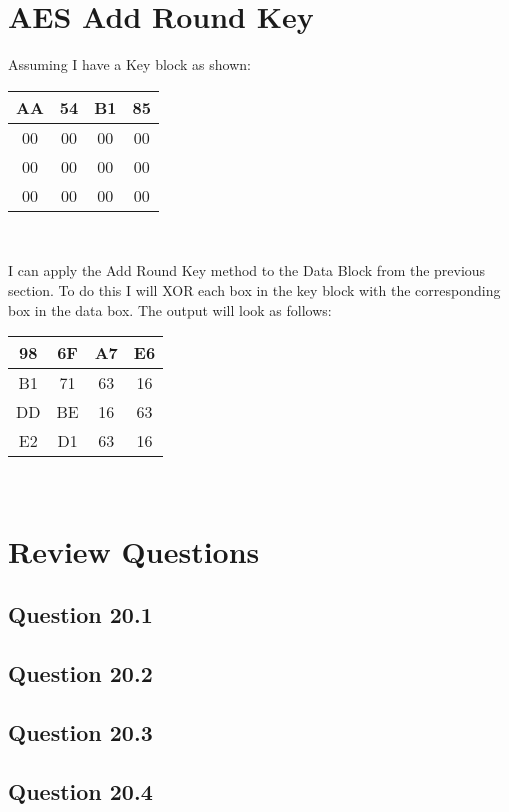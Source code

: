 \documentclass[14pt]{article}
\begin{document}
\section{AES Add Round Key}
Assuming I have a Key block as shown:\\
\begin{center}
  \begin{tabular}{|c|c|c|c|}
    \hline
    AA & 54 & B1 & 85\\
    \hline
    00 & 00 & 00 & 00\\
    \hline
    00 & 00 & 00 & 00\\
    \hline
    00 & 00 & 00 & 00\\
    \hline
  \end{tabular}\\
\end{center}
I can apply the Add Round Key method to the Data Block from the previous section. To do this I will XOR each box in the key block with the corresponding box in the data box. The output will look as follows:\\
\begin{center}
  \begin{tabular}{|c|c|c|c|}
    \hline
    98 & 6F & A7 & E6\\
    \hline
    B1 & 71 & 63 & 16\\
    \hline
    DD & BE & 16 & 63\\
    \hline
    E2 & D1 & 63 & 16\\
    \hline
  \end{tabular}\\
\end{center}
\section{Review Questions}
\subsection{Question 20.1}
\subsection{Question 20.2}
\subsection{Question 20.3}
\subsection{Question 20.4}
\end{document}
